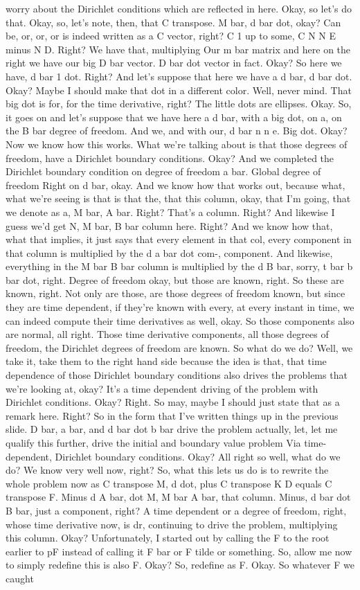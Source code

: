 \documentclass[10pt]{article}
\begin{document}
worry about the Dirichlet conditions which are reflected in here. Okay, so let's do that. Okay, so, let's note, then, that C transpose. M bar, d bar dot, okay? Can be, or, or, or is indeed written as a C vector, right? C 1 up to some, C N N E minus N D. Right? We have that, multiplying Our m bar matrix and here on the right we have our big D bar vector. D bar dot vector in fact. Okay? So here we have, d bar 1 dot. Right? And let's suppose that here we have a d bar, d bar dot. Okay? Maybe I should make that dot in a different color. Well, never mind. That big dot is for, for the time derivative, right? The little dots are ellipses. Okay. So, it goes on and let's suppose that we have here a d bar, with a big dot, on a, on the B bar degree of freedom. And we, and with our, d bar n n e. Big dot. Okay? Now we know how this works. What we're talking about is that those degrees of freedom, have a Dirichlet boundary conditions. Okay? And we completed the Dirichlet boundary condition on degree of freedom a bar. Global degree of freedom Right on d bar, okay. And we know how that works out, because what, what we're seeing is that is that the, that this column, okay, that I'm going, that we denote as a, M bar, A bar. Right? That's a column. Right? And likewise I guess we'd get N, M bar, B bar column here. Right? And we know how that, what that implies, it just says that every element in that col, every component in that column is multiplied by the d a bar dot com-, component. And likewise, everything in the M bar B bar column is multiplied by the d B bar, sorry, t bar b bar dot, right. Degree of freedom okay, but those are known, right. So these are known, right. Not only are those, are those degrees of freedom known, but since they are time dependent, if they're known with every, at every instant in time, we can indeed compute their time derivatives as well, okay. So those components also are normal, all right. Those time derivative components, all those degrees of freedom, the Dirichlet degrees of freedom are known. So what do we do? Well, we take it, take them to the right hand side because the idea is that, that time dependence of those Dirichlet boundary conditions also drives the problems that we're looking at, okay? It's a time dependent driving of the problem with Dirichlet conditions. Okay? Right. So may, maybe I should just state that as a remark here. Right? So in the form that I've written things up in the previous slide. D bar, a bar, and d bar dot b bar drive the problem actually, let, let me qualify this further, drive the initial and boundary value problem Via time-dependent, Dirichlet boundary conditions. Okay? All right so well, what do we do? We know very well now, right? So, what this lets us do is to rewrite the whole problem now as C transpose M, d dot, plus C transpose K D equals C transpose F. Minus d A bar, dot M, M bar A bar, that column. Minus, d bar dot B bar, just a component, right? A time dependent or a degree of freedom, right, whose time derivative now, is dr, continuing to drive the problem, multiplying this column. Okay? Unfortunately, I started out by calling the F to the root earlier to pF instead of calling it F bar or F tilde or something. So, allow me now to simply redefine this is also F. Okay? So, redefine as F. Okay. So whatever F we caught 
\end{document}
